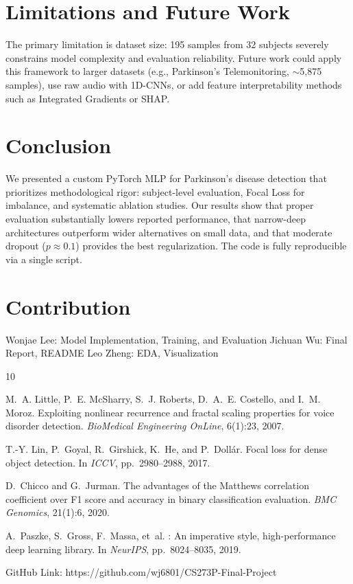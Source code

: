 \documentclass[11pt,a4paper]{article}
\begin{document}
\section{Limitations and Future Work}

The primary limitation is dataset size: 195 samples from 32 subjects severely
constrains model complexity and evaluation reliability. Future work could
apply this framework to larger datasets (e.g., Parkinson's Telemonitoring,
$\sim$5,875 samples), use raw audio with 1D-CNNs, or add feature
interpretability methods such as Integrated Gradients or SHAP.


\section{Conclusion}

We presented a custom PyTorch MLP for Parkinson's disease detection that
prioritizes methodological rigor: subject-level evaluation, Focal Loss for
imbalance, and systematic ablation studies. Our results show that proper
evaluation substantially lowers reported performance, that narrow-deep
architectures outperform wider alternatives on small data, and that moderate
dropout ($p\approx0.1$) provides the best regularization. The code is fully
reproducible via a single script.


\section{Contribution}

Wonjae Lee: Model Implementation, Training, and Evaluation
Jichuan Wu: Final Report, README
Leo Zheng: EDA, Visualization
\begin{thebibliography}{10}

M.~A. Little, P.~E. McSharry, S.~J. Roberts, D.~A.~E. Costello, and I.~M.
Moroz.
\newblock Exploiting nonlinear recurrence and fractal scaling properties for
voice disorder detection.
\newblock \emph{BioMedical Engineering OnLine}, 6(1):23, 2007.

T.-Y. Lin, P.~Goyal, R.~Girshick, K.~He, and P.~Doll\'{a}r.
\newblock Focal loss for dense object detection.
\newblock In \emph{ICCV}, pp.~2980--2988, 2017.

D.~Chicco and G.~Jurman.
\newblock The advantages of the {M}atthews correlation coefficient over {F1}
score and accuracy in binary classification evaluation.
\newblock \emph{BMC Genomics}, 21(1):6, 2020.

A.~Paszke, S.~Gross, F.~Massa, et~al.
: An imperative style, high-performance deep learning
library.
\newblock In \emph{NeurIPS}, pp.~8024--8035, 2019.

\end{thebibliography}


GitHub Link: https://github.com/wj6801/CS273P-Final-Project
\end{document}
